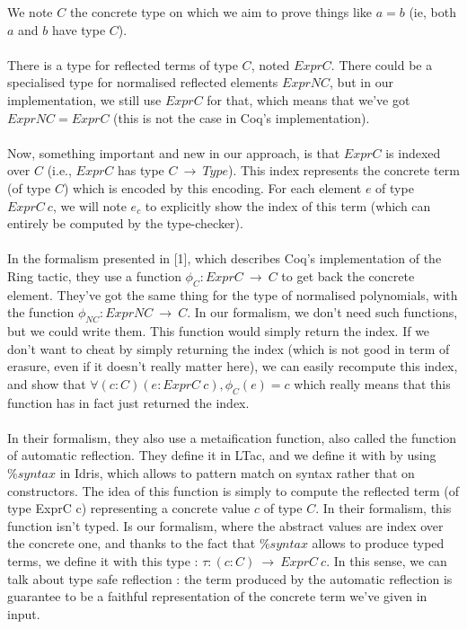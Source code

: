 \documentclass{llncs}
\begin{document}
We note $C$ the concrete type on which we aim to prove things like $a=b$ (ie, both $a$ and $b$ have type $C$).
\\
\\
There is a type for reflected terms of type $C$, noted $ExprC$.
There could be a specialised type for normalised reflected elements $ExprNC$, but in our implementation, we still use $ExprC$ for that, which means that we've got $ExprNC = ExprC$ (this is not the case in Coq's implementation).
\\
\\
Now, something important and new in our approach, is that $ExprC$ is indexed over $C$ (i.e., $ExprC$ has type $C\ \rightarrow\ Type$). This index represents the concrete term (of type $C$) which is encoded by this encoding.
For each element $e$ of type $ExprC\ c$, we will note $e_c$ to explicitly show the index of this term (which can entirely be computed by the type-checker).
\\
\\
In the formalism presented in [1], which describes Coq's implementation of the Ring tactic, they use a function $\phi_{C} : ExprC\ \rightarrow\ C$ to get back the concrete element.
They've got the same thing for the type of normalised polynomials, with the function $\phi_{NC} : ExprNC\ \rightarrow\ C$. 
In our formalism, we don't need such functions, but we could write them. This function would simply return the index. If we don't want to cheat by simply returning the index (which is not good in term of erasure, even if it doesn't really matter here), we can easily recompute this index, and show that $\forall (c:C) (e:ExprC\ c), \phi_C (e) = c$ which really means that this function has in fact just returned the index.
\\
\\
In their formalism, they also use a metaification function, also called the function of automatic reflection. They define it in LTac, and we define it with  by using $\%syntax$ in Idris, which allows to pattern match on syntax rather that on constructors. The idea of this function is simply to compute the reflected term (of type ExprC c) representing a concrete value $c$ of type $C$.
In their formalism, this function isn't typed. Is our formalism, where the abstract values are index over the concrete one, and thanks to the fact that $\%syntax$ allows to produce typed terms, we define it with this type : $\tau : (c:C)\ \rightarrow\ ExprC\ c$. In this sense, we can talk about type safe reflection : the term produced by the automatic reflection is guarantee to be a faithful representation of the concrete term we've given in input.
\end{document}
